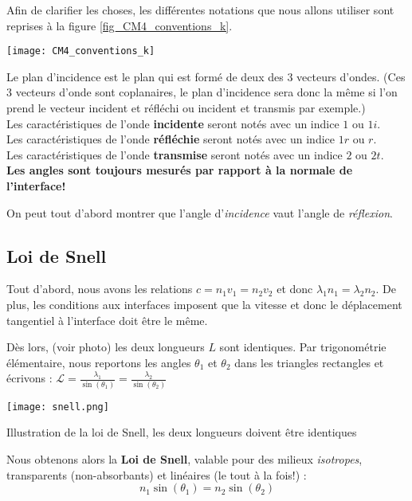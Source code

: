Afin de clarifier les choses, les différentes notations que nous allons utiliser sont reprises à la figure \ref{fig_CM4_conventions_k}.
\begin{marginfigure}
\texttt{[image: CM4\_conventions\_k]}
\caption{Le plan d'incidence est le plan qui est formé de deux des 3 vecteurs d'ondes. (Ces 3 vecteurs d'onde sont coplanaires, le plan d'incidence sera donc la même si l'on prend le vecteur incident et réfléchi ou incident et transmis par exemple.)\\
Les caractéristiques de l'onde \textbf{incidente} seront notés avec un indice $1$ ou $1i$.\\
Les caractéristiques de l'onde \textbf{réfléchie} seront notés avec un indice $1r$ ou $r$. \\
Les caractéristiques de l'onde \textbf{transmise} seront notés avec un indice $2$ ou $2t$. \\
\textbf{Les angles sont toujours mesurés par rapport à la normale de l'interface!}}
\label{fig_CM4_conventions_k}
\end{marginfigure}

On peut tout d'abord montrer que l'angle d'\textit{incidence} vaut l'angle de \textit{réflexion}. 

\subsection{Loi de Snell}

Tout d'abord, nous avons les relations  $c = n_{1} v_{1} = n_{2} v_{2}$ et donc $\lambda_{1} n_{1}= \lambda_{2} n_{2}$.
De plus, les conditions aux interfaces imposent que la vitesse et donc le déplacement tangentiel à l'interface doit être le même.

Dès lors, (voir photo) les deux longueurs $L$ sont identiques. Par trigonométrie élémentaire, nous reportons les angles $\theta_{1}$ et $\theta_{2}$ 
dans les triangles rectangles et écrivons : $\mathcal{L} = \frac{\lambda_{1}}{\sin(\theta_{1})} = \frac{\lambda_{2}}{\sin(\theta_{2})}$

\begin{marginfigure}
\texttt{[image: snell.png]}
\caption{Illustration de la loi de Snell, les deux longueurs doivent être identiques}
\end{marginfigure}

Nous obtenons alors la \textbf{Loi de Snell}, valable pour des milieux \textit{isotropes}, transparents (non-absorbants) et linéaires (le tout à la fois!) :
\[ n_{1} \sin(\theta_{1}) = n_{2} \sin(\theta_{2})\]

